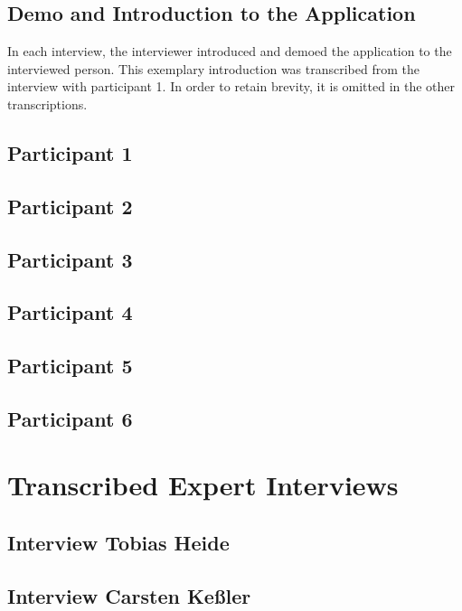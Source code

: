 \subsection{Demo and Introduction to the Application}

In each interview, the interviewer introduced and demoed the application to the interviewed person. This exemplary introduction was transcribed from the interview with participant 1. In order to retain brevity, it is omitted in the other transcriptions.



\subsection{Participant 1}



\subsection{Participant 2}



\subsection{Participant 3}



\subsection{Participant 4}



\subsection{Participant 5}



\subsection{Participant 6}



\section{Transcribed Expert Interviews}

\subsection{Interview Tobias Heide}



\subsection{Interview Carsten Ke{\ss}ler}

